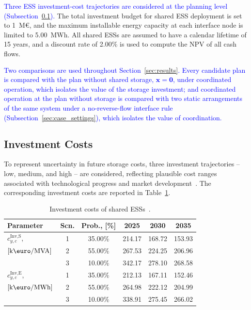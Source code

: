 \documentclass[preprint,12pt]{elsarticle}
\begin{document}
\textcolor{blue}{
    Three ESS investment-cost trajectories are considered at the planning level (Subsection~\ref{subsec:case_investment_costs}).
}
The total investment budget for shared ESS deployment is set to 1~M\euro, and the maximum installable energy capacity at each interface node is limited to 5.00~MWh. All shared ESSs are assumed to have a calendar lifetime of 15 years, and a discount rate of 2.00\% is used to compute the NPV of all cash flows.

\textcolor{blue}{
    Two comparisons are used throughout Section~\ref{sec:results}. Every candidate plan is compared with the plan without shared storage, $\boldsymbol{x} = \boldsymbol{0}$, under coordinated operation, which isolates the value of the storage investment; and coordinated operation at the plan without storage is compared with two static arrangements of the same system under a no-reverse-flow interface rule (Subsection~\ref{sec:case_settings}), which isolates the value of coordination.
}

\subsection{Investment Costs}
\label{subsec:case_investment_costs}

To represent uncertainty in future storage costs, three investment trajectories -- low, medium, and high -- are considered, reflecting plausible cost ranges associated with technological progress and market development~\cite{nrel_ess_costs,iea_ess_2024}. The corresponding investment costs are reported in Table~\ref{tab:investment_cost}.

\begin{table}[htbp!]
    \centering
    \caption{Investment costs of shared ESSs~\cite{nrel_ess_costs}.}
    \begin{tabular}{lcc ccc}
        \toprule
        Parameter & Scn. & Prob., [\%] & 2025 & 2030 & 2035 \\ 
        \midrule
        $c^\text{Inv,S}_{y,c}$,     & 1 & 35.00\% & 214.17 & 168.72 & 153.93\\
        $\left[\text{k\euro/MVA}\right]$ & 2 & 55.00\% & 267.53 & 224.25 & 206.96\\
        ~                           & 3 & 10.00\% & 342.17 & 278.10 & 268.58\\
        \midrule
        $c^\text{Inv,E}_{y,c}$, & 1 & 35.00\% & 212.13 & 167.11 & 152.46\\
        $\left[\text{k\euro/MWh}\right]$ & 2 & 55.00\% & 264.98 & 222.12 & 204.99\\
        ~                           & 3 & 10.00\% & 338.91 & 275.45 & 266.02\\
        \bottomrule
    \end{tabular}
    \label{tab:investment_cost}
\end{table}
\end{document}
